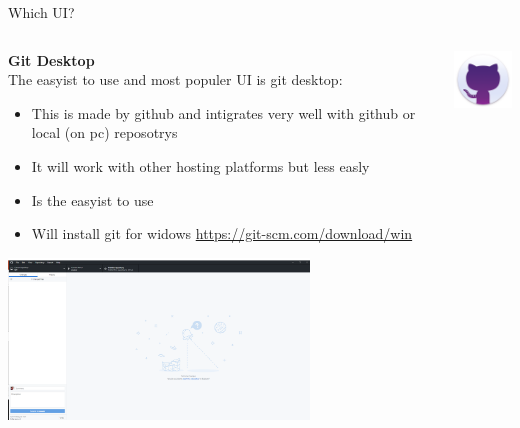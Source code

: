 \documentclass[10pt]{beamer}
\begin{document}
\begin{frame}[fragile]{Which UI?}
  \begin{columns}[T]
    \begin{column}{.8\textwidth}
  	\textbf{Git Desktop\\}
	The easyist to use and most populer UI is git desktop:
	\begin{itemize}
		\item This is made by github and intigrates very well with github or local (on pc) reposotrys
		\item It will work with other hosting platforms but less easly
		\item Is the easyist to use
		\item Will install git for widows \url{https://git-scm.com/download/win}
	\end{itemize}
	\includegraphics[width=8cm]{Figs/GHD/outline_02}
    \end{column}
    \begin{column}{.2\textwidth}
	\includegraphics[width=2cm]{Figs/git/gitdesktop} \newline  \newline  \newline 
    \end{column}
  \end{columns}
\end{frame}
\end{document}
